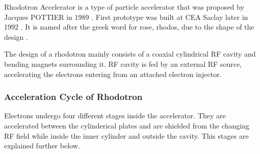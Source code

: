 \documentclass[a4paper,oneside,12pt]{report}
\numberwithin{equation}{chapter}
\begin{document}
Rhodotron Accelerator is a type of particle accelerator that was proposed by Jacques POTTIER in 1989 \cite{rhodo_pottier}. 
First prototype was built at CEA Saclay later in 1992 \cite{rhodo_prototype}. It is named after the greek word for rose, rhodos, due to the shape of the design \cite{rhodos}.

The design of a rhodotron mainly consists of a coaxial cylindrical RF cavity and bending magnets surrounding it. RF cavity is fed by an external RF source, accelerating the electrons entering from an attached electron injector.


\subsubsection{\hspace{4pt}Acceleration Cycle of Rhodotron}\hspace{4pt}
Electrons undergo four different stages inside the accelerator. 
They are accelerated between the cylinderical plates and are shielded from the changing RF field while inside the inner cylinder and outside the cavity. 
This stages are explained further below.

\end{document}
